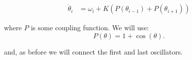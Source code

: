 \documentclass{article}
\begin{document}
\begin{subequations} \label{eq_Nexcoupled}
\begin{align} 
    \dot{\theta}_i &= \omega_i + K \left(P(\theta_{i-1})+P(\theta_{i+1})\right)  
\end{align}
\end{subequations}

where $P$ is some coupling function. We will use:
\begin{equation} \label{eq_adlers}
    P(\theta) = 1 + \cos(\theta).
\end{equation}

and, as before we will connect the first and last oscillators.





\begin{figure} [h]
    \centerline{}
    \caption{}
    \label{fig_nexccoupled}
\end{figure}
\end{document}
